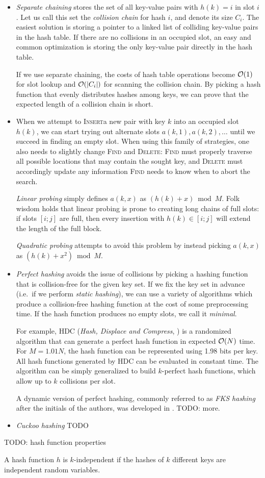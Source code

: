 \begin{itemize}
\item
\emph{Separate chaining} stores the set of all key-value pairs with
$h(k)=i$ in slot $i$. Let us call this set the \emph{collision chain} for hash
$i$, and denote its size $C_i$. The easiest solution is storing a pointer to
a linked list of colliding key-value pairs in the hash table. If there are no
collisions in an occupied slot, an easy and common optimization is storing
the only key-value pair directly in the hash table.

If we use separate chaining, the costs of hash table operations become $\mathcal{O}(1)$
for slot lookup and $\mathcal{O}(|C_i|)$ for scanning the collision chain. By picking
a hash function that evenly distributes hashes among keys, we can prove
that the expected length of a collision chain is short.

\item
When we attempt to \textsc{Insert}a new pair with key $k$ into an occupied slot
$h(k)$, we can start trying out alternate slots $a(k,1), a(k,2), \ldots$
until we succeed in finding an empty slot. When using this family of strategies,
one also needs to slightly change \textsc{Find} and \textsc{Delete}:
\textsc{Find} must properly traverse all possible locations that may contain
the sought key, and \textsc{Delete} must accordingly update any information
\textsc{Find} needs to know when to abort the search.

\emph{Linear probing} simply defines $a(k,x)$ as $(h(k)+x) \bmod M$.
Folk wisdom holds that linear probing is prone to creating long chains
of full slots: if slots $[i;j]$ are full, then every insertion with
$h(k)\in[i;j]$ will extend the length of the full block.

\emph{Quadratic probing} attempts to avoid this problem by instead picking
$a(k,x)$ as $(h(k)+x^2) \bmod M$.

\item
\emph{Perfect hashing} avoids the issue of collisions by picking a hashing
function that is collision-free for the given key set. If we fix the key
set in advance (i.e.\ if we perform \emph{static hashing}), we can use
a variety of algorithms which produce a collision-free hashing function
at the cost of some preprocessing time. If the hash function produces no
empty slots, we call it \emph{minimal}.

For example, HDC (\textit{Hash, Displace and Compress},
\cite{hdc-hashing}) is a randomized algorithm that can generate a perfect
hash function in expected $\mathcal{O}(N)$ time. For $M=1.01 N$, the hash function can be
represented using 1.98 bits per key. All hash functions generated by HDC can be
evaluated in constant time. The algorithm can be simply generalized to build
$k$-perfect hash functions, which allow up to $k$ collisions per slot.

A dynamic version of perfect hashing, commonly referred to as \emph{FKS
hashing} after the initials of the authors, was developed in \cite{fks-hashing}.
TODO: more.

\item
\emph{Cuckoo hashing}
TODO

\end{itemize}

TODO: hash function properties

A hash function $h$ is $k$-independent if the hashes of $k$ different keys
are independent random variables.
